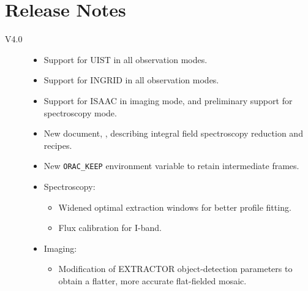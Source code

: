 \documentclass[twoside,11pt,nolof]{starlink}
\begin{document}
\scfrontmatter








\section{Release Notes}

\begin{description}

\item[V4.0]

\begin{itemize}

\item Support for UIST in all observation modes.

\item Support for INGRID in all observation modes.

\item Support for ISAAC in imaging mode, and preliminary support for
spectroscopy mode.

\item New document, , describing integral field
  spectroscopy reduction and recipes.

\item New \texttt{ORAC\_KEEP} environment variable to retain intermediate
  frames.

\item Spectroscopy:

\begin{itemize}

\item Widened optimal extraction windows for better profile fitting.

\item Flux calibration for I-band.

\end{itemize}

\item Imaging:

\begin{itemize}

\item Modification of EXTRACTOR object-detection parameters to obtain a
    flatter, more accurate flat-fielded mosaic.


\end{itemize}
\end{itemize}
\end{description}
\end{document}
